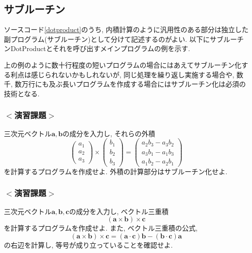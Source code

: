 \documentclass[a4j]{jsarticle}
\begin{document}
\subsection{サブルーチン}
ソースコード\ref{dotproduct}のうち, 
内積計算のように汎用性のある部分は独立した副プログラム(サブルーチン)として分けて記述するのがよい. 
以下にサブルーチンDotProductとそれを呼び出すメインプログラムの例を示す. 

上の例のように数十行程度の短いプログラムの場合にはあえてサブルーチン化する利点は感じられないかもしれないが, 
同じ処理を繰り返し実施する場合や, 
数千, 数万行にも及ぶ長いプログラムを作成する場合にはサブルーチン化は必須の技術となる. 


\subsubsection*{$<$演習課題$>$}
三次元ベクトル$\bm{a}, \bm{b}$の成分を入力し, それらの外積
\begin{equation}
\begin{pmatrix}
a_1 \\ a_2 \\ a_3
\end{pmatrix}
\times
\begin{pmatrix}
b_1 \\ b_2 \\ b_3
\end{pmatrix}
=
\begin{pmatrix}
a_2b_3-a_3b_2 \\ a_3b_1-a_1b_3 \\ a_1b_2-a_2b_1
\end{pmatrix}
\end{equation}
を計算するプログラムを作成せよ. 
外積の計算部分はサブルーチン化せよ. 
%

\subsubsection*{$<$演習課題$>$}
三次元ベクトル$\bm{a}, \bm{b}, \bm{c}$の成分を入力し, ベクトル三重積
\begin{equation}
(\bm{a} \times \bm{b}) \times \bm{c}
\end{equation}
を計算するプログラムを作成せよ. 
また, ベクトル三重積の公式, 
\begin{equation}
(\bm{a} \times \bm{b}) \times \bm{c} = (\bm{a} \cdot \bm{c})\bm{b} - (\bm{b} \cdot \bm{c})\bm{a}
\end{equation}
の右辺を計算し, 等号が成り立っていることを確認せよ. 
%
\end{document}
